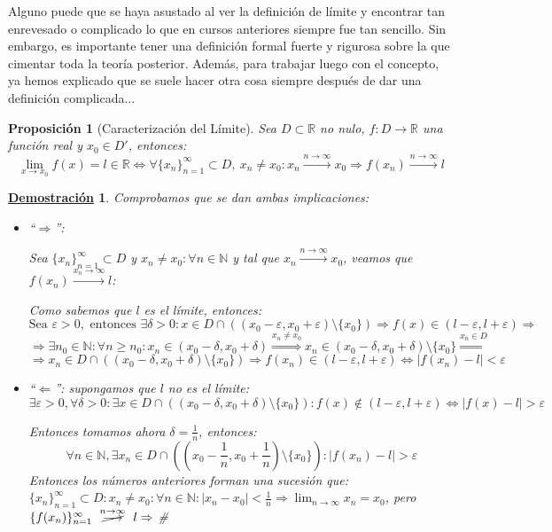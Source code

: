 \documentclass[10pt,a4paper,openright]{book}
\theoremstyle{break}
\newtheorem{prop}{Proposición}[chapter]
\newtheorem*{demo}{\underline{Demostración}}
\begin{document}
Alguno puede que se haya asustado al ver la definición de límite y encontrar tan enrevesado o complicado lo que en cursos anteriores siempre fue tan sencillo. Sin embargo, es importante tener una definición formal fuerte y rigurosa sobre la que cimentar toda la teoría posterior. Además, para trabajar luego con el concepto, ya hemos explicado que se suele hacer otra cosa siempre después de dar una definición complicada...

\begin{prop}[Caracterización del Límite]
Sea $D\subset \mathbb R$ no nulo, $f:D\longrightarrow \mathbb R$ una función real y $x_0\in D'$, entonces:
\[
\lim_{x\rightarrow x_0} f(x)=l\in \mathbb R \Leftrightarrow \forall \{x_n\}_{n=1}^\infty\subset D, \ x_n\neq x_0: x_n\xrightarrow{n\rightarrow \infty} x_0\Rightarrow 	f(x_n)\xrightarrow{n\rightarrow \infty} l
\]
\end{prop}
\begin{demo}
Comprobamos que se dan ambas implicaciones:
	\begin{itemize}
	\item ``$\Rightarrow$'': \par
	Sea $\{x_n\}_{n=1}^\infty\subset D$ y $x_n\neq x_0: \forall n\in \mathbb N$ y tal que $x_n\xrightarrow{n\rightarrow \infty} x_0$, veamos que $f(x_n)\xrightarrow{x_n\rightarrow \infty} l$:
	
	Como sabemos que $l$ es el límite, entonces:
	$$\mbox{Sea }\varepsilon>0,\mbox{ entonces } \exists \delta >0: x\in D\cap \left((x_0-\varepsilon, x_0+\varepsilon)\mbox{\textbackslash} \{x_0\}\right)\Rightarrow f(x)\in (l-\varepsilon, l+\varepsilon)\Rightarrow$$
	$$\Rightarrow \exists n_0\in \mathbb N: \forall n\geq n_0: x_n \in (x_0-\delta, x_0+\delta)\stackrel{x_n\neq x_0}{\Rightarrow}x_n \in (x_0-\delta, x_0+\delta)\mbox{\textbackslash}\{x_0\}\stackrel{x_n\in D}{\Rightarrow}$$
	$$\Rightarrow  x_n \in D\cap\left((x_0-\delta, x_0+\delta)\mbox{\textbackslash}\{x_0\}\right)\Rightarrow f(x_n)\in (l-\varepsilon, l+\varepsilon)\Leftrightarrow |f(x_n)-l|<\varepsilon$$
	
	\item ``$\Leftarrow$'': supongamos que $l$ no es el límite:
	$$\exists \varepsilon>0, \forall \delta>0: \exists x\in D\cap \left((x_0-\delta, x_0+\delta)\mbox{\textbackslash} \{x_0\}\right): f(x)\notin (l-\varepsilon, l+\varepsilon)\Leftrightarrow |f(x)-l|>\varepsilon$$
	
	Entonces tomamos ahora $\delta=\frac{1}{n}$, entonces:
	$$\forall n\in \mathbb N, \exists x_n\in D\cap \left((x_0-\frac{1}{n}, x_0+\frac{1}{n})\mbox{\textbackslash} \{x_0\}\right): |f(x_n)-l|>\varepsilon$$
	Entonces los números anteriores forman una sucesión que: $\{x_n\}_{n=1}^\infty\subset D: x_n\neq x_0: \forall n\in \mathbb N: |x_n-x_0|<\frac{1}{n}\Rightarrow \lim_{n\rightarrow\infty} x_n=x_0$, pero $\{f(x_n)\}_{n=1}^\infty \mbox{ }\stackrel{n\rightarrow\infty}{\cancel{\longrightarrow}}\mbox{ } l\Rightarrow$ \#	
	\end{itemize}
\end{demo}
\end{document}
